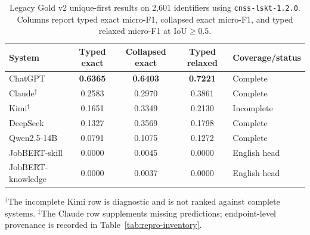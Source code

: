 \begin{table}[htbp]
\caption{Legacy Gold v2 unique-first results on 2,601 identifiers using \texttt{cnss-lskt-1.2.0}. Columns report typed exact micro-F1, collapsed exact micro-F1, and typed relaxed micro-F1 at $\mathrm{IoU}\geq0.5$.}
\label{tab:gold-v2}
\centering
\footnotesize
\begingroup
\setlength{\tabcolsep}{4pt}
\renewcommand{\arraystretch}{1.08}
\begin{tabularx}{\textwidth}{@{}P{0.28\textwidth}cccL@{}}
\toprule
\textbf{System} & \textbf{Typed exact} & \textbf{Collapsed exact} & \textbf{Typed relaxed} & \textbf{Coverage/status} \\
\midrule
ChatGPT & \textbf{0.6365} & \textbf{0.6403} & \textbf{0.7221} & Complete \\
Claude$^{\ddagger}$ & 0.2583 & 0.2970 & 0.3861 & Complete \\
Kimi$^{\dagger}$ & 0.1651 & 0.3349 & 0.2130 & Incomplete \\
DeepSeek & 0.1327 & 0.3569 & 0.1798 & Complete \\
Qwen2.5-14B & 0.0791 & 0.1075 & 0.1272 & Complete \\
JobBERT-skill & 0.0000 & 0.0045 & 0.0000 & English head \\
JobBERT-knowledge & 0.0000 & 0.0037 & 0.0000 & English head \\
\bottomrule
\end{tabularx}
\endgroup

\vspace{0.3em}
\raggedright\footnotesize $^{\dagger}$The incomplete Kimi row is diagnostic and is not ranked against complete systems. $^{\ddagger}$The Claude row supplements missing predictions; endpoint-level provenance is recorded in Table~\ref{tab:repro-inventory}.
\end{table}

